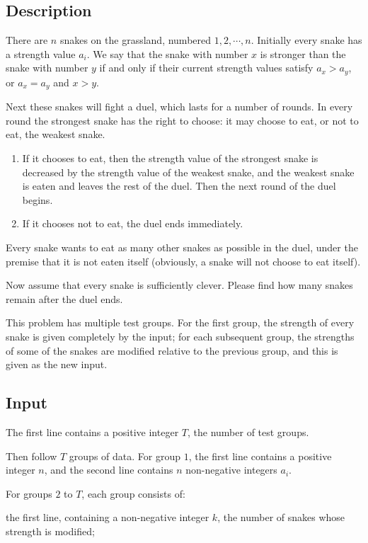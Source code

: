 \documentclass[11pt]{article}
\begin{document}
\subsection*{Description}

There are $n$ snakes on the grassland, numbered $1, 2, \cdots, n$.
Initially every snake has a strength value $a_i$.
We say that the snake with number $x$ is stronger than the snake with
number $y$ if and only if their current strength values satisfy $a_x > a_y$,
or $a_x = a_y$ and $x > y$.

Next these snakes will fight a duel, which lasts for a number of rounds.
In every round the strongest snake has the right to choose: it may choose to
eat, or not to eat, the weakest snake.
\begin{enumerate}
\item If it chooses to eat, then the strength value of the strongest snake is
  decreased by the strength value of the weakest snake, and the weakest snake
  is eaten and leaves the rest of the duel.
  Then the next round of the duel begins.
\item If it chooses not to eat, the duel ends immediately.
\end{enumerate}
Every snake wants to eat as many other snakes as possible in the duel, under
the premise that it is not eaten itself (obviously, a snake will not choose to
eat itself).

Now assume that every snake is sufficiently clever.
Please find how many snakes remain after the duel ends.

This problem has multiple test groups.
For the first group, the strength of every snake is given completely by the
input;
for each subsequent group, the strengths of some of the snakes are modified
relative to the previous group, and this is given as the new input.

\subsection*{Input}

The first line contains a positive integer $T$, the number of test groups.

Then follow $T$ groups of data.
For group $1$, the first line contains a positive integer $n$, and the second
line contains $n$ non-negative integers $a_i$.

For groups $2$ to $T$, each group consists of:

the first line, containing a non-negative integer $k$, the number of snakes
whose strength is modified;
\end{document}
